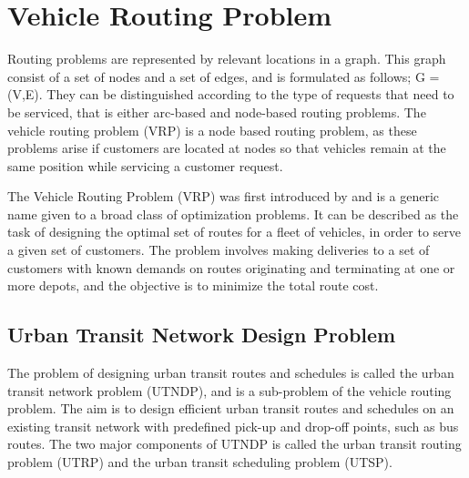 \section{Vehicle Routing Problem }
Routing problems are represented by relevant locations in a graph. This graph consist of a set of nodes and a set of edges, and is formulated as follows; G = (V,E). They can be distinguished according to the type of requests that need to be serviced, that is either arc-based and node-based routing problems. The vehicle routing problem (VRP) is a node based routing problem, as these problems arise if customers are located at nodes so that vehicles remain at the same position while servicing a customer request\citep{vehiclerouting}.

The Vehicle Routing Problem (VRP) was first introduced by \citet{dantzig59} and is a generic name given to a broad class of optimization problems. It can be described as the task of designing the optimal set of routes for a fleet of vehicles, in order to serve a given set of customers. The problem involves making deliveries to a set of customers with known demands on routes originating and terminating at one or more depots, and the objective is to minimize the total route cost. 

\subsection{Urban Transit Network Design Problem}

The problem of designing urban transit routes and schedules is called the urban transit network problem (UTNDP), and is a sub-problem of the vehicle routing problem. The aim is to design efficient urban transit routes and schedules on an existing transit network with predefined pick-up and drop-off points, such as bus routes. The two major components of UTNDP is called the urban transit routing problem (UTRP) and the urban transit scheduling problem (UTSP).

